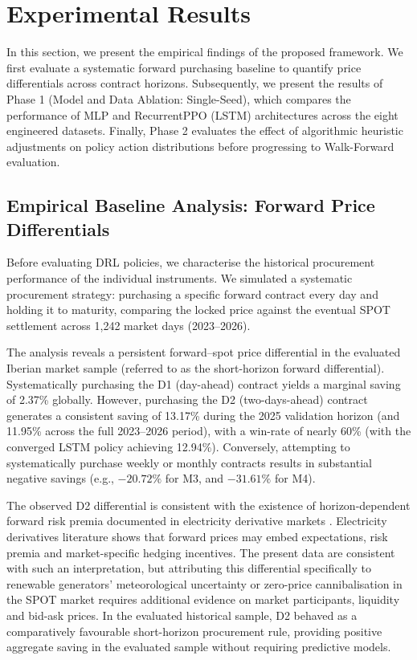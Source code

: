 \section{Experimental Results}
\label{sec:results}

In this section, we present the empirical findings of the proposed framework. We first evaluate a systematic forward purchasing baseline to quantify price differentials across contract horizons. Subsequently, we present the results of Phase 1 (Model and Data Ablation: Single-Seed), which compares the performance of MLP and RecurrentPPO (LSTM) architectures across the eight engineered datasets. Finally, Phase 2 evaluates the effect of algorithmic heuristic adjustments on policy action distributions before progressing to Walk-Forward evaluation.

\subsection{Empirical Baseline Analysis: Forward Price Differentials}
\label{subsec:res_baseline}

Before evaluating DRL policies, we characterise the historical procurement performance of the individual instruments. We simulated a systematic procurement strategy: purchasing a specific forward contract every day and holding it to maturity, comparing the locked price against the eventual SPOT settlement across 1,242 market days (2023--2026).

The analysis reveals a persistent forward--spot price differential in the evaluated Iberian market sample (referred to as the short-horizon forward differential). Systematically purchasing the D1 (day-ahead) contract yields a marginal saving of 2.37\% globally. However, purchasing the D2 (two-days-ahead) contract generates a consistent saving of 13.17\% during the 2025 validation horizon (and 11.95\% across the full 2023--2026 period), with a win-rate of nearly 60\% (with the converged LSTM policy achieving 12.94\%). Conversely, attempting to systematically purchase weekly or monthly contracts results in substantial negative savings (e.g., $-20.72\%$ for M3, and $-31.61\%$ for M4).

The observed D2 differential is consistent with the existence of horizon-dependent forward risk premia documented in electricity derivative markets \cite{huisman2012electricity, woo2001cross, huisman2009electricity}. Electricity derivatives literature shows that forward prices may embed expectations, risk premia and market-specific hedging incentives. The present data are consistent with such an interpretation, but attributing this differential specifically to renewable generators' meteorological uncertainty or zero-price cannibalisation in the SPOT market requires additional evidence on market participants, liquidity and bid-ask prices. In the evaluated historical sample, D2 behaved as a comparatively favourable short-horizon procurement rule, providing positive aggregate saving in the evaluated sample without requiring predictive models.

